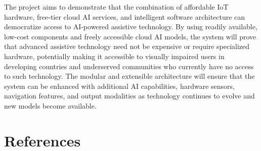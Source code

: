 The project aims to demonstrate that the combination of affordable IoT hardware, free-tier cloud AI services, and intelligent software architecture can democratize access to AI-powered assistive technology. By using readily available, low-cost components and freely accessible cloud AI models, the system will prove that advanced assistive technology need not be expensive or require specialized hardware, potentially making it accessible to visually impaired users in developing countries and underserved communities who currently have no access to such technology. The modular and extensible architecture will ensure that the system can be enhanced with additional AI capabilities, hardware sensors, navigation features, and output modalities as technology continues to evolve and new models become available.

\chapter{References}


